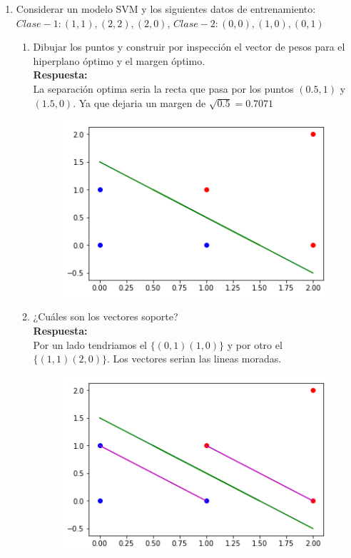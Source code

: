\documentclass[12pt,a4paper]{article}
\begin{document}
\begin{enumerate}
	\item Considerar un modelo SVM y los siguientes datos de entrenamiento: $Clase-1:{(1,1),(2,2),(2,0)}$, $Clase-2:{(0,0),(1,0),(0,1)}$

	\begin{enumerate}
		\item Dibujar los puntos y construir por inspección el vector de pesos para el hiperplano óptimo y el margen óptimo.
		\\	\textbf{Respuesta: }\\
		La separación optima seria la recta que pasa por los puntos $(0.5,1)$ y $(1.5,0)$. Ya que dejaria un margen de $\sqrt{0.5}=0.7071$
		\begin{figure}[H]
			\centering
			\includegraphics[width=0.7\linewidth]{porInspeccion}
	
			\label{fig:porinspeccion}
		\end{figure}
		\item ¿Cuáles son los vectores soporte?
		\\	\textbf{Respuesta: }\\
		Por un lado tendriamos el $\{(0,1)(1,0)\}$ y por otro el $\{(1,1)(2,0)\}$. Los vectores serian las lineas moradas. 
		\begin{figure}[H]
			\centering
			\includegraphics[width=0.7\linewidth]{vectoresSoporte}


\end{figure}
\end{enumerate}
\end{enumerate}
\end{document}
